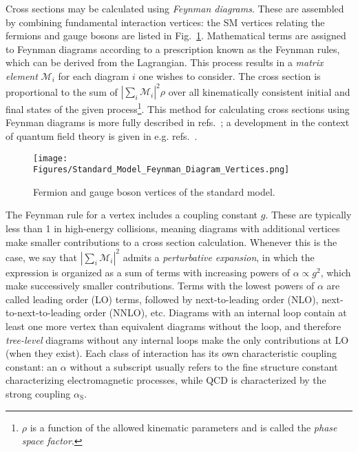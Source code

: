 Cross sections may be calculated using \textit{Feynman diagrams}. These are
assembled by combining fundamental interaction vertices: the SM vertices relating the fermions and gauge bosons are listed in Fig.~\ref{fig:sm_vertices}.
Mathematical terms are assigned to Feynman diagrams according to a prescription known as the Feynman rules, which can be derived from the Lagrangian.
This process results in a \textit{matrix element} $\mathcal{M}_{i}$ for each diagram $i$ one wishes to consider. The cross section is proportional to the sum of $|\sum_{i}{\mathcal{M}_{i}}|^{2}\rho$
over all kinematically consistent initial and final states of the given process\footnote{$\rho$ is a function of the allowed kinematic parameters and is called the \textit{phase space
factor}.}. This method for calculating cross sections using Feynman diagrams is more fully described in refs.~\cite{ref:HalzenMartin, ref:BargerPhillips};
a development in the context of quantum field theory is given in e.g. refs.~\cite{ref:PeskinSchroeder, ref:Srednicki, ref:Schwartz}.

\begin{figure}[hbtp]
  \begin{center}
    \texttt{[image: Figures/Standard\_Model\_Feynman\_Diagram\_Vertices.png]}
    \caption{
      Fermion and gauge boson vertices of the standard model.
    }
    \label{fig:sm_vertices}
  \end{center}
\end{figure}

The Feynman rule for a vertex includes a coupling constant $g$. These are typically less than 1 in high-energy collisions, meaning diagrams
with additional vertices make smaller contributions to a cross section calculation. Whenever this is the case, we say that
$|\sum_{i}{\mathcal{M}_{i}}|^{2}$ admits a \textit{perturbative expansion}, in which the expression is organized as a sum of terms with increasing powers
of $\alpha \propto g^{2}$, which make successively smaller contributions.
Terms with the lowest powers of $\alpha$ are called leading order (LO) terms, followed by next-to-leading order (NLO), next-to-next-to-leading order (NNLO), etc.
Diagrams with an internal loop contain at least one more vertex than equivalent diagrams without the loop, and therefore \textit{tree-level} diagrams without any internal loops
make the only contributions at LO (when they exist). Each class of interaction has its own characteristic coupling constant:
an $\alpha$ without a subscript usually refers to the fine structure constant characterizing electromagnetic processes, while QCD is characterized by the strong coupling $\alpha_\mathrm{S}$.


